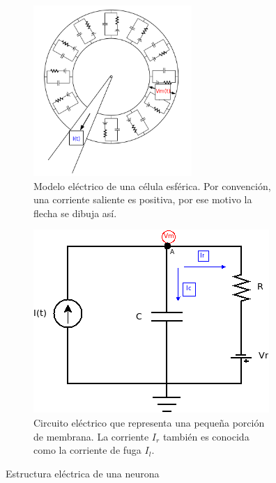 \begin{figure}[htbp!]
        \centering
        \begin{subfigure}[b]{0.45\textwidth}  
            \centering 
            \includegraphics[width=6cm]{figures/neurona_esferica_conceptual.png}
            \caption{Modelo eléctrico de una célula esférica. Por convención, una corriente saliente es positiva, por ese motivo la flecha se dibuja así.}
            \label{fig:modelo_neurona_esferica}
        \end{subfigure}
         \hspace{0.5cm}
        \begin{subfigure}[b]{0.45\textwidth}
            \centering
            \includegraphics[width=\textwidth]{figures/integrate_fire_con_potencial_reposo.png}
            \caption{Circuito eléctrico que representa una pequeña porción de membrana. La corriente $I_r$ también es conocida como la corriente de fuga $I_l$.}
            \label{fig:circuito_electrico_integrate_and_fire_potencial_reposo}
        \end{subfigure}
        \quad
        \caption{Estructura eléctrica de una neurona}
        \label{fig:estructura_electrica_neurona}
\end{figure}
